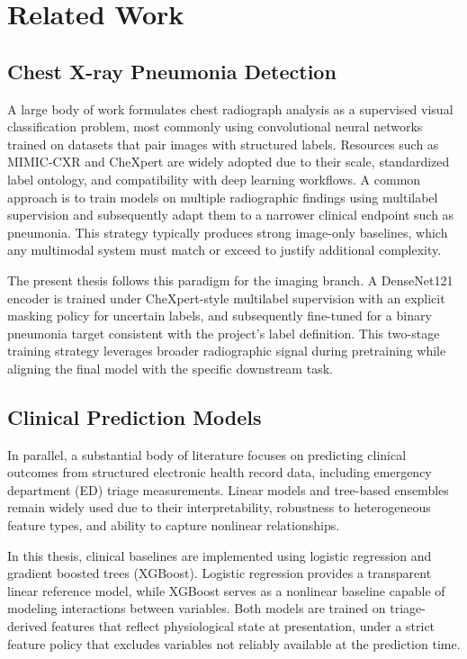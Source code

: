 \chapter{Related Work}

\section{Chest X-ray Pneumonia Detection}

A large body of work formulates chest radiograph analysis as a supervised visual classification problem, most commonly using convolutional neural networks trained on datasets that pair images with structured labels. Resources such as MIMIC-CXR and CheXpert are widely adopted due to their scale, standardized label ontology, and compatibility with deep learning workflows. A common approach is to train models on multiple radiographic findings using multilabel supervision and subsequently adapt them to a narrower clinical endpoint such as pneumonia. This strategy typically produces strong image-only baselines, which any multimodal system must match or exceed to justify additional complexity.

The present thesis follows this paradigm for the imaging branch. A DenseNet121 encoder is trained under CheXpert-style multilabel supervision with an explicit masking policy for uncertain labels, and subsequently fine-tuned for a binary pneumonia target consistent with the project’s label definition. This two-stage training strategy leverages broader radiographic signal during pretraining while aligning the final model with the specific downstream task.

\section{Clinical Prediction Models}

In parallel, a substantial body of literature focuses on predicting clinical outcomes from structured electronic health record data, including emergency department (ED) triage measurements. Linear models and tree-based ensembles remain widely used due to their interpretability, robustness to heterogeneous feature types, and ability to capture nonlinear relationships.

In this thesis, clinical baselines are implemented using logistic regression and gradient boosted trees (XGBoost). Logistic regression provides a transparent linear reference model, while XGBoost serves as a nonlinear baseline capable of modeling interactions between variables. Both models are trained on triage-derived features that reflect physiological state at presentation, under a strict feature policy that excludes variables not reliably available at the prediction time.

